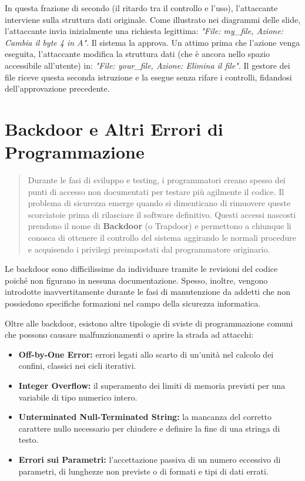 \documentclass{article}
\begin{document}
In questa frazione di secondo (il ritardo tra il controllo e l'uso), l'attaccante interviene sulla struttura dati originale. Come illustrato nei diagrammi delle slide, l'attaccante invia inizialmente una richiesta legittima: \textit{"File: my\_file, Azione: Cambia il byte 4 in A"}. Il sistema la approva. Un attimo prima che l'azione venga eseguita, l'attaccante modifica la struttura dati (che è ancora nello spazio accessibile all'utente) in: \textit{"File: your\_file, Azione: Elimina il file"}. Il gestore dei file riceve questa seconda istruzione e la esegue senza rifare i controlli, fidandosi dell'approvazione precedente.

\vspace{0.8cm}

\section*{Backdoor e Altri Errori di Programmazione}

\begin{quote}
    Durante le fasi di sviluppo e testing, i programmatori creano spesso dei punti di accesso non documentati per testare più agilmente il codice. Il problema di sicurezza emerge quando si dimenticano di rimuovere queste scorciatoie prima di rilasciare il software definitivo. Questi accessi nascosti prendono il nome di \textbf{Backdoor} (o Trapdoor) e permettono a chiunque li conosca di ottenere il controllo del sistema aggirando le normali procedure e acquisendo i privilegi preimpostati dal programmatore originario.
\end{quote}

Le backdoor sono difficilissime da individuare tramite le revisioni del codice poiché non figurano in nessuna documentazione. Spesso, inoltre, vengono introdotte inavvertitamente durante le fasi di manutenzione da addetti che non possiedono specifiche formazioni nel campo della sicurezza informatica.

Oltre alle backdoor, esistono altre tipologie di sviste di programmazione comuni che possono causare malfunzionamenti o aprire la strada ad attacchi:

\begin{itemize}
    \item \textbf{Off-by-One Error:} errori legati allo scarto di un'unità nel calcolo dei confini, classici nei cicli iterativi.
    \item \textbf{Integer Overflow:} il superamento dei limiti di memoria previsti per una variabile di tipo numerico intero.
    \item \textbf{Unterminated Null-Terminated String:} la mancanza del corretto carattere nullo necessario per chiudere e definire la fine di una stringa di testo.
    \item \textbf{Errori sui Parametri:} l'accettazione passiva di un numero eccessivo di parametri, di lunghezze non previste o di formati e tipi di dati errati.
\end{itemize}
\end{document}
